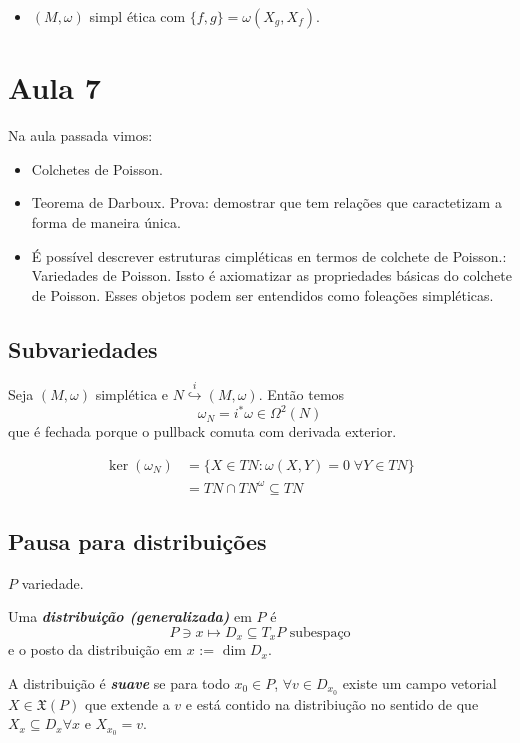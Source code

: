 \begin{example}\leavevmode 
	\begin{itemize}
		\item $(M,\omega)$ simpl \'etica com $\{f,g\} =\omega(X_g,X_f)$.
	\end{itemize}
\end{example}

\section{Aula 7}

Na aula passada vimos:

\begin{itemize}
	\item Colchetes de Poisson.
	\item Teorema de Darboux. Prova: demostrar que tem relaç\~oes que caractetizam a forma de maneira \'unica.
	\item \'E poss\'ivel descrever estruturas cimpl\'eticas en termos de colchete de Poisson.: Variedades de Poisson. Issto \'e axiomatizar as propriedades b\'asicas do colchete de Poisson. Esses objetos podem ser entendidos como foleaç\~oes simpl\'eticas.
\end{itemize}

\subsection{Subvariedades}

Seja $(M,\omega)$ simpl\'etica e $N\overset{i}{\hookrightarrow }(M,\omega)$. Ent\~ao temos
\[\omega_N=i^* \omega\in\Omega^2(N)\]
que \'e fechada porque o pullback comuta com derivada exterior.

\begin{align*}
	 \ker(\omega_N)& =\{X\in T N:\omega(X,Y)=0\;\forall Y\in T N\} \\
	 &=T N\cap T N^\omega\subseteq T N
\end{align*}

\subsection{Pausa para distribuiç\~oes}
$P$ variedade.

\begin{defn}
	Uma \textit{\textbf{distribuiç\~ao (generalizada)}} em $P$ \'e
	\[P\ni x\longmapsto D_x\subseteq T_xP\text{ subespaço} \]
	e o posto da distribuiç\~ao em $x$ := $\dim D_x$.

	A distribuiç\~ao \'e \textit{\textbf{suave}} se para todo $x_0\in P$, $\forall v\in D_{x_0}$ existe um campo vetorial $X\in\mathfrak{X}(P)$ que extende a $v$ e est\'a contido na distribiuç\~ao no sentido de que $X_x\subseteq D_x\forall x$ e $X_{x_0}=v$.
\end{defn}

